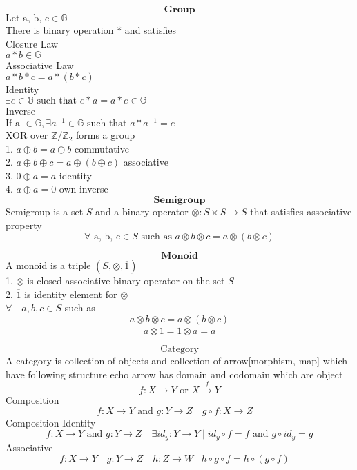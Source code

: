 \documentclass[10pt]{article}
\begin{document}
\[ \textbf{Group} \]
$\text{Let a, b, c} \in \mathbb{G} $\\
There is binary operation * and satisfies\\

Closure Law\\
$ a*b \in \mathbb{G} $\\

Associative Law\\
$ a*b*c = a*(b*c)$\\

Identity\\
$ \exists \mathit{e} \in \mathbb{G} \text{ such that } \mathit{e}*a = a*\mathit{e} \in \mathbb{G}$\\

Inverse\\
$ \text{If a } \in \mathbb{G}, \exists a^{-1} \in \mathbb{G} \text{ such that } a*a^{-1} = e $\\

XOR over $\mathbb{Z}/\mathbb{Z}_2$ forms a group\\
1. $ a \oplus b = a \oplus b $ commutative\\ 
2. $ a \oplus b \oplus c = a \oplus (b \oplus c) $ associative\\ 
3. $ 0 \oplus a = a $ identity\\ 
4. $ a \oplus a = 0 $ own inverse\\  

\[ \textbf{ Semigroup } \]
Semigroup is a set $S$ and a binary operator $\otimes \colon S \times S \rightarrow S$ that satisfies 
associative property\\ 
\[ \forall \text{ a, b, c} \in S \text{ such as } a \otimes b\otimes c = a \otimes (b \otimes c) \]

\[ \textbf{ Monoid } \]
A monoid is a triple $(S, \otimes, \overline{1})$ \\
1. $\otimes$ is closed associative binary operator on the set $S$ \\
2. $\overline{1}$ is identity element for $\otimes$ \\
$\forall\quad a, b, c \in S$ such as\\
\[ a \otimes b  \otimes c = a \otimes (b \otimes c)   \]
\[ a \otimes \overline{1} = \overline{1} \otimes a =  a  \]

\newpage
\[ \text{ Category } \]
A category is collection of objects and collection of arrow[morphism, map] which have following structure
echo arrow has domain and codomain which are object     
\[ f \colon X \rightarrow Y \text{ or } X \xrightarrow{f} Y\]
Composition
\[ f \colon X \rightarrow Y \text{ and } g \colon Y \rightarrow Z \quad g \circ f \colon X \rightarrow Z \quad \]
Composition Identity
\[ f \colon X \rightarrow Y \text{ and } g \colon Y \rightarrow Z  \quad \exists id_y \colon Y \rightarrow Y \mid id_y \circ f = f \text{ and } g \circ id_y = g \]
Associative
\[ f \colon X \rightarrow Y \quad g \colon Y \rightarrow Z \quad h \colon Z \rightarrow W \mid h \circ g \circ f = h \circ (g \circ f) \quad \]
\end{document}
